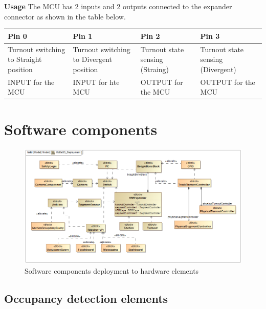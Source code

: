 \textbf{Usage}
The MCU has 2 inputs and 2 outputs connected to the expander connector as shown in the table below.
\begin{center}
	\renewcommand{\arraystretch}{1.5}
	\begin{tabu} to 1.0\textwidth {X[c] X[c] X[c] X[c]}
		\toprule
		Pin 0                                  & Pin 1                                   & Pin 2                           & Pin 3                             \\ \midrule
		Turnout switching to Straight position & Turnout switching to Divergent position & Turnout state sensing (Straing) & Turnout state sensing (Divergent) \\
		INPUT for the MCU                      & INPUT for hte MCU                       & OUTPUT for the MCU              & OUTPUT for the MCU                \\ \bottomrule
	\end{tabu}
\end{center}


\section{Software components}\label{section:CustomSW}
\begin{figure}[h]
	\centering
	\includegraphics[width=150mm]{figures/modes3/MoDeS3_Deployment1.png}
	\caption{Software components deployment to hardware elements}
	\label{fig:Modes3Deployment}
\end{figure}

\subsection{Occupancy detection elements} \label{section:OccupancyDetection}
